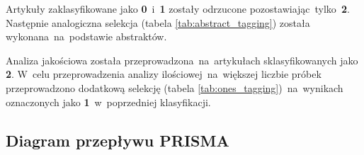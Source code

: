 Artykuły zaklasyfikowane jako {\bf0}~i~{\bf1} zostały odrzucone pozostawiając~tylko~{\bf2}. Następnie analogiczna selekcja (tabela \ref{tab:abstract_tagging}) została wykonana~na~podstawie abstraktów.

Analiza jakościowa została przeprowadzona~na~artykułach sklasyfikowanych jako \textbf{2}. W~celu przeprowadzenia analizy ilościowej~na~większej liczbie próbek przeprowadzono dodatkową selekcję (tabela \ref{tab:ones_tagging})~na~wynikach oznaczonych jako \textbf{1}~w~poprzedniej klasyfikacji.


\subsection{Diagram przepływu PRISMA}
\begin{figure}[H]
	\centering
	
	\label{fig:prisma_diagram}
\end{figure}
